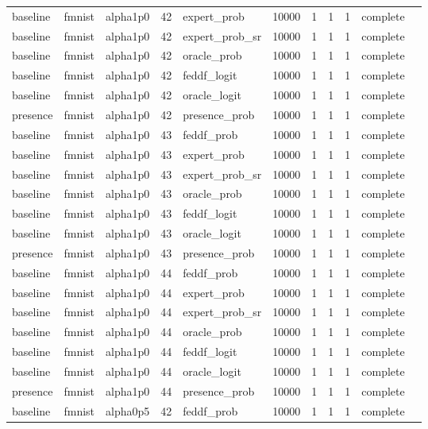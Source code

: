 \begin{tabular}{lllrlrrrrll}
baseline & fmnist & alpha1p0 & 42 & expert\_prob & 10000 & 1 & 1 & 1 & complete &  \\
baseline & fmnist & alpha1p0 & 42 & expert\_prob\_sr & 10000 & 1 & 1 & 1 & complete &  \\
baseline & fmnist & alpha1p0 & 42 & oracle\_prob & 10000 & 1 & 1 & 1 & complete &  \\
baseline & fmnist & alpha1p0 & 42 & feddf\_logit & 10000 & 1 & 1 & 1 & complete &  \\
baseline & fmnist & alpha1p0 & 42 & oracle\_logit & 10000 & 1 & 1 & 1 & complete &  \\
presence & fmnist & alpha1p0 & 42 & presence\_prob & 10000 & 1 & 1 & 1 & complete &  \\
baseline & fmnist & alpha1p0 & 43 & feddf\_prob & 10000 & 1 & 1 & 1 & complete &  \\
baseline & fmnist & alpha1p0 & 43 & expert\_prob & 10000 & 1 & 1 & 1 & complete &  \\
baseline & fmnist & alpha1p0 & 43 & expert\_prob\_sr & 10000 & 1 & 1 & 1 & complete &  \\
baseline & fmnist & alpha1p0 & 43 & oracle\_prob & 10000 & 1 & 1 & 1 & complete &  \\
baseline & fmnist & alpha1p0 & 43 & feddf\_logit & 10000 & 1 & 1 & 1 & complete &  \\
baseline & fmnist & alpha1p0 & 43 & oracle\_logit & 10000 & 1 & 1 & 1 & complete &  \\
presence & fmnist & alpha1p0 & 43 & presence\_prob & 10000 & 1 & 1 & 1 & complete &  \\
baseline & fmnist & alpha1p0 & 44 & feddf\_prob & 10000 & 1 & 1 & 1 & complete &  \\
baseline & fmnist & alpha1p0 & 44 & expert\_prob & 10000 & 1 & 1 & 1 & complete &  \\
baseline & fmnist & alpha1p0 & 44 & expert\_prob\_sr & 10000 & 1 & 1 & 1 & complete &  \\
baseline & fmnist & alpha1p0 & 44 & oracle\_prob & 10000 & 1 & 1 & 1 & complete &  \\
baseline & fmnist & alpha1p0 & 44 & feddf\_logit & 10000 & 1 & 1 & 1 & complete &  \\
baseline & fmnist & alpha1p0 & 44 & oracle\_logit & 10000 & 1 & 1 & 1 & complete &  \\
presence & fmnist & alpha1p0 & 44 & presence\_prob & 10000 & 1 & 1 & 1 & complete &  \\
baseline & fmnist & alpha0p5 & 42 & feddf\_prob & 10000 & 1 & 1 & 1 & complete &  \\

\end{tabular}
